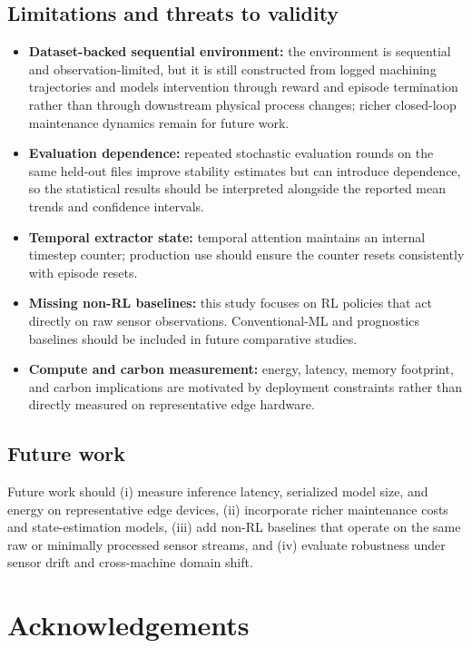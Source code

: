 \documentclass[sn-basic]{sn-jnl} %
\begin{document}
\subsection{Limitations and threats to validity}
\begin{itemize}
        \item \textbf{Dataset-backed sequential environment:} the environment is sequential and observation-limited, but it is still constructed from logged machining trajectories and models intervention through reward and episode termination rather than through downstream physical process changes; richer closed-loop maintenance dynamics remain for future work.
        \item \textbf{Evaluation dependence:} repeated stochastic evaluation rounds on the same held-out files improve stability estimates but can introduce dependence, so the statistical results should be interpreted alongside the reported mean trends and confidence intervals.
        \item \textbf{Temporal extractor state:} temporal attention maintains an internal timestep counter; production use should ensure the counter resets consistently with episode resets.
        \item \textbf{Missing non-RL baselines:} this study focuses on RL policies that act directly on raw sensor observations. Conventional-ML and prognostics baselines should be included in future comparative studies.
        \item \textbf{Compute and carbon measurement:} energy, latency, memory footprint, and carbon implications are motivated by deployment constraints rather than directly measured on representative edge hardware.
\end{itemize}

\subsection{Future work}
Future work should (i) measure inference latency, serialized model size, and energy on representative edge devices, (ii) incorporate richer maintenance costs and state-estimation models, (iii) add non-RL baselines that operate on the same raw or minimally processed sensor streams, and (iv) evaluate robustness under sensor drift and cross-machine domain shift.



\section*{Acknowledgements}
\end{document}
